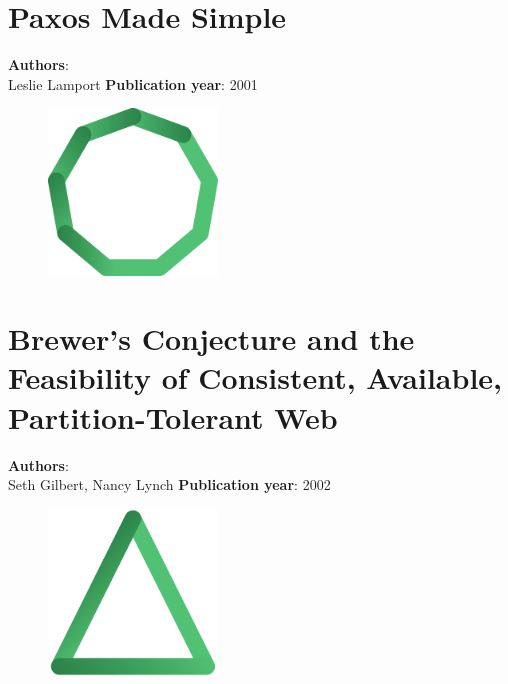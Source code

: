 \documentclass[11pt,fleqn]{book} %
\begin{document}
\chapter{Paxos Made Simple}
\vspace*{-7mm}
\Large \textbf{Authors}: \\
Leslie Lamport
\newline\newline
\textbf{Publication year}: 2001
\begin{figure}[b]
    \centering
    \includegraphics[width=0.4\textwidth]{distributed-systems.pdf}
\end{figure}


\chapter{Brewer’s Conjecture and the Feasibility of Consistent, Available, Partition-Tolerant Web}
\vspace*{-7mm}
\Large \textbf{Authors}: \\
Seth Gilbert, Nancy Lynch
\newline\newline
\textbf{Publication year}: 2002
\begin{figure}[b]
    \centering
    \includegraphics[width=0.4\textwidth]{distributed-systems-triangle.pdf}
\end{figure}

\end{document}
